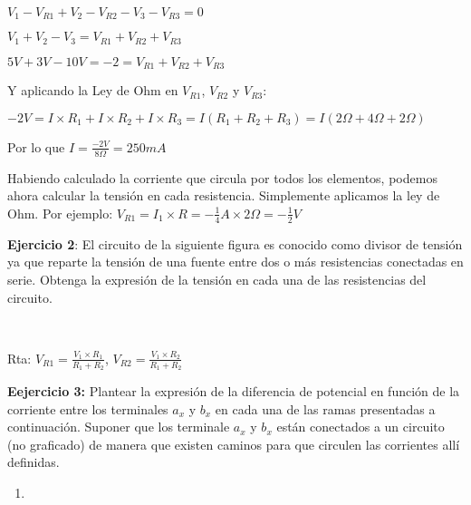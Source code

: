 \documentclass[11pt]{article}
\providecommand{\tightlist}{%
      \setlength{\itemsep}{0pt}\setlength{\parskip}{0pt}}
\begin{document}
\(V_1-V_{R1}+V_2-V_{R2}-V_3-V_{R3}=0\)

\(V_1+V_2-V_3=V_{R1}+V_{R2}+V_{R3}\)

\(5V+3V-10V=-2=V_{R1}+V_{R2}+V_{R3}\)

Y aplicando la Ley de Ohm en \(V_{R1}\), \(V_{R2}\) y \(V_{R3}\):

\(-2V=I\times R_1+I \times R_2+I \times R_3=I(R_1+R_2+R_3)=I(2\Omega+4\Omega+2\Omega)\)

Por lo que \(I=\frac{-2V}{8\Omega}=250mA\)

    Habiendo calculado la corriente que circula por todos los elementos,
podemos ahora calcular la tensión en cada resistencia. Simplemente
aplicamos la ley de Ohm. Por ejemplo:
\(V_{R1}=I_1\times R=-\frac{1}{4}A\times 2\Omega=-\frac{1}{2}V\)

    \textbf{Ejercicio 2}: El circuito de la siguiente figura es conocido
como divisor de tensión ya que reparte la tensión de una fuente entre
dos o más resistencias conectadas en serie. Obtenga la expresión de la
tensión en cada una de las resistencias del circuito.

    \begin{center}
    \end{center}
    { \hspace*{\fill} \\}
    
    Rta: \(V_{R1}=\frac{V_1 \times R_{1}}{R_1+R_2}\),
\(V_{R2}=\frac{V_1 \times R_{2}}{R_1+R_2}\)

\textbf{Eejercicio 3:} Plantear la expresión de la diferencia de
potencial en función de la corriente entre los terminales \(a_x\) y
\(b_x\) en cada una de las ramas presentadas a continuación. Suponer que
los terminale \(a_x\) y \(b_x\) están conectados a un circuito (no
graficado) de manera que existen caminos para que circulen las
corrientes allí definidas.

\begin{enumerate}
\def\labelenumi{\alph{enumi})}
\tightlist
\item
\end{enumerate}

    \begin{center}
    \end{center}
    { \hspace*{\fill} \\}
    
\end{document}
